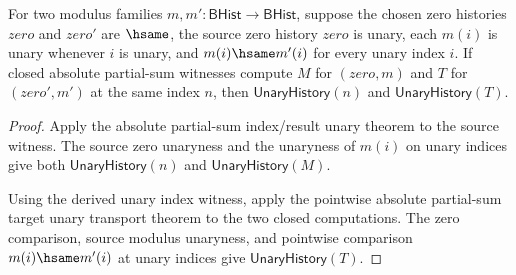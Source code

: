 \begin{theorem}
\label{thm:real-analytic-complex-abs-part-sum-closed-pointwise-index-result-unary-transport}
For two modulus families $m,m':\mathsf{BHist}\to\mathsf{BHist}$, suppose
the chosen zero histories $zero$ and $zero'$ are $\hsame$, the source zero
history $zero$ is unary, each $m(i)$ is unary whenever $i$ is unary, and
$m(i)\hsame m'(i)$ for every unary index $i$. If closed absolute partial-sum
witnesses compute $M$ for $(zero,m)$ and $T$ for $(zero',m')$ at the same
index $n$, then $\mathsf{UnaryHistory}(n)$ and $\mathsf{UnaryHistory}(T)$.
\end{theorem}
\begin{proof}
Apply the absolute partial-sum index/result unary theorem to the source
witness. The source zero unaryness and the unaryness of $m(i)$ on unary
indices give both $\mathsf{UnaryHistory}(n)$ and $\mathsf{UnaryHistory}(M)$.

Using the derived unary index witness, apply the pointwise absolute partial-sum
target unary transport theorem to the two closed computations. The zero
comparison, source modulus unaryness, and pointwise comparison
$m(i)\hsame m'(i)$ at unary indices give $\mathsf{UnaryHistory}(T)$.
\end{proof}

